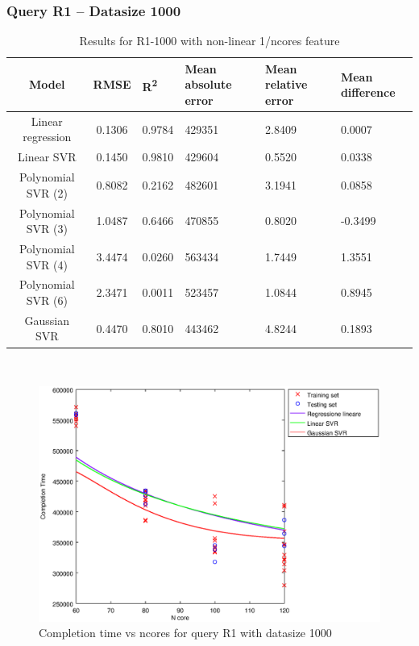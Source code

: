 \documentclass[a4paper,11pt]{article}
\begin{document}
\newpage
\subsubsection{Query R1 -- Datasize 1000}
\begin{table}[H]
	\centering
	\begin{adjustbox}{center}
		\begin{tabular}{c | c M{1.2cm} M{2.5cm} M{2.5cm} M{1.8cm}}
			Model & RMSE & R\textsuperscript{2} & Mean absolute error & Mean relative error & Mean difference \tabularnewline
			\hline
			Linear regression & 0.1306 & 0.9784 & 429351 & 2.8409 & 0.0007 \\
			Linear SVR & 0.1450 & 0.9810 & 429604 & 0.5520 & 0.0338 \\
			Polynomial SVR (2) & 0.8082 & 0.2162 & 482601 & 3.1941 & 0.0858 \\
			Polynomial SVR (3) & 1.0487 & 0.6466 & 470855 & 0.8020 & -0.3499 \\
			Polynomial SVR (4) & 3.4474 & 0.0260 & 563434 & 1.7449 & 1.3551 \\
			Polynomial SVR (6) & 2.3471 & 0.0011 & 523457 & 1.0844 & 0.8945 \\
			Gaussian SVR & 0.4470 & 0.8010 & 443462 & 4.8244 & 0.1893 \\
		\end{tabular}
	\end{adjustbox}
	\\
	\caption{Results for R1-1000 with non-linear 1/ncores feature}
	\label{table_R1_prediction_all}
\end{table}

\begin {figure}[hbtp]
\centering
\includegraphics[width=\textwidth]{output/R1_1000_1_OVER_NCORES/plot_R1_1000_bestmodels.eps}
\caption {Completion time vs ncores for query R1 with datasize 1000}
\end {figure}
\end{document}
